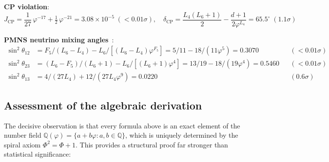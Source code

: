 \documentclass[12pt,a4paper]{article}
\begin{document}
\textbf{CP violation}:
\begin{equation}
J_{\text{CP}} = \frac{1}{27}\,\varphi^{-17} + \tfrac{1}{2}\,\varphi^{-21} = 3.08 \times 10^{-5} \; ({<}0.01\sigma), \quad
\delta_{\text{CP}} = \frac{L_4(L_6{+}1)}{2} - \frac{d+1}{2\varphi^{L_4}} = 65.5^\circ \; (1.1\sigma)
\end{equation}

\textbf{PMNS neutrino mixing angles}~\cite{Pontecorvo1968,MNS1962,NuFIT53}:
\begin{align}
\sin^2\theta_{12} &= F_5/(L_6{-}L_4) - L_6/[(L_6{-}L_4)\varphi^{F_5}] = 5/11 - 18/(11\varphi^5) = 0.3070 && ({<}0.01\sigma) \\
\sin^2\theta_{23} &= (L_6{-}F_5)/(L_6{+}1) - L_6/[(L_6{+}1)\varphi^4] = 13/19 - 18/(19\varphi^4) = 0.5460 && ({<}0.01\sigma) \\
\sin^2\theta_{13} &= 4/(27L_4) + 12/(27L_4\varphi^9) = 0.0220 && (0.6\sigma)
\end{align}

\subsection{Assessment of the algebraic derivation}

The decisive observation is that every formula above is an exact element of the number field $\mathbb{Q}(\varphi) = \{a + b\varphi : a,b \in \mathbb{Q}\}$, which is uniquely determined by the spiral axiom $\Phi^2 = \Phi + 1$. This provides a structural proof far stronger than statistical significance:
\end{document}
